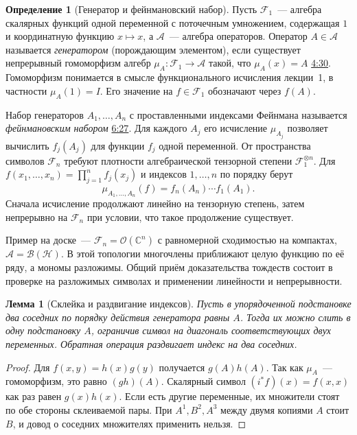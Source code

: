 \documentclass[11pt,a4paper]{article}
\theoremstyle{plain}
\newtheorem{lemma}[theorem]{Лемма}
\theoremstyle{definition}
\newtheorem{definition}[theorem]{Определение}
\newcommand{\CC}{\mathbb C}
\newcommand{\Hh}{\mathcal H}
\newcommand{\id}{I}
\newcommand{\at}[3]{\href{https://www.youtube.com/watch?v=#1&t=#2s}{#3}}
\begin{document}
\begin{definition}[Генератор и фейнмановский набор]
Пусть $\mathcal F_1$~--- алгебра скалярных функций одной
переменной с поточечным умножением, содержащая $1$ и
координатную функцию $x\mapsto x$, а $\mathcal A$~---
алгебра операторов. Оператор $A\in\mathcal A$ называется
\emph{генератором} (порождающим элементом), если существует
непрерывный гомоморфизм алгебр
$\mu_A:\mathcal F_1\to\mathcal A$ такой, что
$\mu_A(x)=A$ \at{8kQuUxC-VVg}{270}{4:30}.
Гомоморфизм понимается в смысле функционального исчисления
лекции~1, в частности $\mu_A(1)=\id$. Его значение
на $f\in\mathcal F_1$ обозначают через $f(A)$.

Набор генераторов $A_1,\ldots,A_n$ с проставленными
индексами Фейнмана называется \emph{фейнмановским набором}
\at{8kQuUxC-VVg}{387}{6:27}. Для каждого $A_j$ его
исчисление $\mu_{A_j}$ позволяет вычислить $f_j(A_j)$
для функции $f_j$ одной переменной.
От пространства символов $\mathcal F_n$ требуют плотности
алгебраической тензорной степени $\mathcal F_1^{\otimes n}$.
Для $f(x_1,\ldots,x_n)=\prod_{j=1}^n f_j(x_j)$ и
индексов $1,\ldots,n$ по порядку берут
\[
 \mu_{A_1,\ldots,A_n}(f)=f_n(A_n)\cdots f_1(A_1).
\]
Сначала исчисление продолжают линейно на тензорную
степень, затем непрерывно на $\mathcal F_n$ при условии,
что такое продолжение существует.
\end{definition}
Пример на доске~--- $\mathcal F_n=\mathcal O(\CC^n)$
с равномерной сходимостью на компактах, $\mathcal A=\mathcal B(\Hh)$.
В этой топологии многочлены приближают целую функцию по её
ряду, а мономы разложимы. Общий приём доказательства
тождеств состоит в проверке на разложимых символах и
применении линейности и непрерывности.

\begin{lemma}[Склейка и раздвигание индексов]
Пусть в упорядоченной подстановке два соседних по порядку
действия генератора равны $A$. Тогда их можно слить в одну
подстановку $A$, ограничив символ на диагональ
соответствующих двух переменных. Обратная операция
раздвигает индекс на два соседних.
\end{lemma}
\begin{proof}
Для $f(x,y)=h(x)g(y)$ получается $g(A)h(A)$.
Так как $\mu_A$~--- гомоморфизм, это равно
$(gh)(A)$. Скалярный символ $(i^*f)(x)=f(x,x)$
как раз равен $g(x)h(x)$. Если есть другие переменные,
их множители стоят по обе стороны склеиваемой пары.
При $A^1,B^2,A^3$ между двумя копиями $A$ стоит $B$,
и довод о соседних множителях применить нельзя.
\end{proof}
\end{document}

